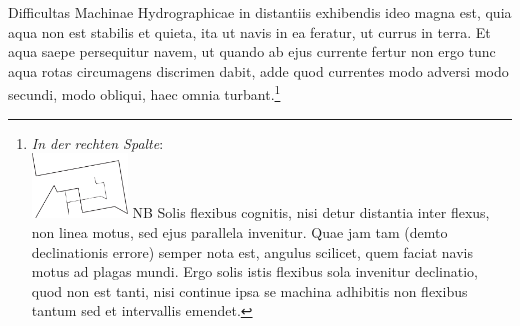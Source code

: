 \pstart\noindent\hangindent=10mm\hspace{10mm}Difficultas Machinae Hydrographicae\protect{} in distantiis exhibendis ideo magna est, quia aqua non est stabilis et quieta, ita ut navis\protect{} in ea feratur, ut currus in terra. Et aqua saepe persequitur navem\protect{}, ut quando ab ejus currente fertur non ergo tunc aqua rotas\protect{} circumagens discrimen dabit, adde quod currentes modo adversi modo secundi, modo obliqui, haec omnia turbant.\footnote{\textit{In der rechten Spalte}:\\
 \protect\includegraphics[width=0.2\textwidth]{images/LH38_18v_2}
NB Solis flexibus cognitis, nisi detur distantia inter flexus, non linea motus, sed ejus parallela invenitur. Quae jam tam (demto declinationis\protect{} errore) semper nota est, angulus scilicet, quem faciat navis\protect{} motus ad plagas mundi. Ergo solis istis flexibus sola invenitur declinatio\protect{}, quod non est tanti, nisi continue ipsa se machina adhibitis non flexibus tantum sed et intervallis emendet.}
